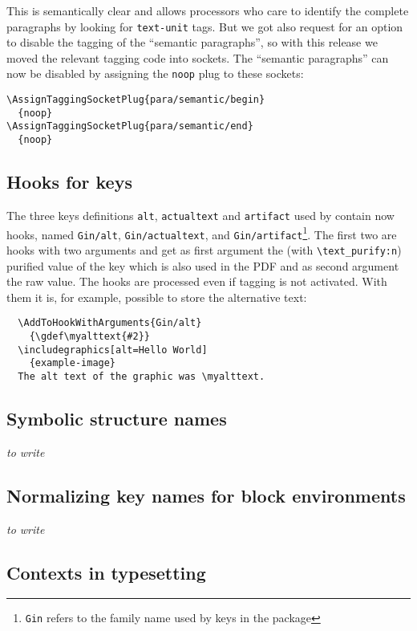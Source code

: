 \documentclass{ltnews}
\begin{document}
This is semantically clear and allows processors who care to identify
the complete paragraphs by looking for \texttt{text-unit} tags. 
But we got also request for an option to disable the tagging of the 
\enquote{semantic paragraphs}, so with this release we moved the relevant tagging 
code into sockets. The \enquote{semantic paragraphs} can now be disabled by 
assigning the \texttt{noop} plug to these sockets:
\begin{verbatim}
\AssignTaggingSocketPlug{para/semantic/begin}
  {noop}
\AssignTaggingSocketPlug{para/semantic/end}
  {noop}
\end{verbatim}

\subsection{Hooks for  keys}

The three keys definitions \texttt{alt}, \texttt{actualtext} and
\texttt{artifact} used by  contain now hooks,
named \texttt{Gin/alt}, \texttt{Gin/actualtext}, and
\texttt{Gin/artifact}\footnote{\texttt{Gin} refers to the family name
used by keys in the  package}.  The first two are hooks
with two arguments and get as first argument the (with
\verb+\text_purify:n+) purified value of the key which is also used in
the PDF and as second argument the raw value.  The hooks are processed
even if tagging is not activated.  With them it is, for example,
possible to store the alternative text:
\begin{verbatim}
  \AddToHookWithArguments{Gin/alt}
    {\gdef\myalttext{#2}}
  \includegraphics[alt=Hello World]
    {example-image}
  The alt text of the graphic was \myalttext.
\end{verbatim}


\subsection{Symbolic structure names}

\emph{to write}


\subsection{Normalizing key names for block environments}

\emph{to write}


\subsection{Contexts in typesetting}
\end{document}
